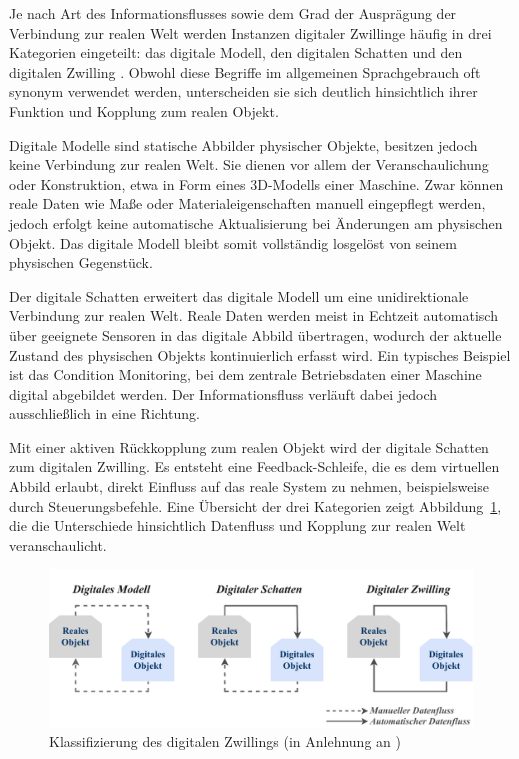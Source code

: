 Je nach Art des Informationsflusses sowie dem Grad der Ausprägung der Verbindung zur realen Welt werden Instanzen digitaler Zwillinge häufig in drei Kategorien eingeteilt: das digitale Modell, den digitalen Schatten und den digitalen Zwilling \cite{ClassificationDT}.
Obwohl diese Begriffe im allgemeinen Sprachgebrauch oft synonym verwendet werden, unterscheiden sie sich deutlich hinsichtlich ihrer Funktion und Kopplung zum realen Objekt.

Digitale Modelle sind statische Abbilder physischer Objekte, besitzen jedoch keine Verbindung zur realen Welt. 
Sie dienen vor allem der Veranschaulichung oder Konstruktion, etwa in Form eines 3D-Modells einer Maschine. 
Zwar können reale Daten wie Maße oder Materialeigenschaften manuell eingepflegt werden, jedoch erfolgt keine automatische Aktualisierung bei Änderungen am physischen Objekt. 
Das digitale Modell bleibt somit vollständig losgelöst von seinem physischen Gegenstück.

Der digitale Schatten erweitert das digitale Modell um eine unidirektionale Verbindung zur realen Welt.
Reale Daten werden meist in Echtzeit automatisch über geeignete Sensoren in das digitale Abbild übertragen, wodurch der aktuelle Zustand des physischen Objekts kontinuierlich erfasst wird.
Ein typisches Beispiel ist das Condition Monitoring, bei dem zentrale Betriebsdaten einer Maschine digital abgebildet werden.
Der Informationsfluss verläuft dabei jedoch ausschließlich in eine Richtung.

Mit einer aktiven Rückkopplung zum realen Objekt wird der digitale Schatten zum digitalen Zwilling.
Es entsteht eine Feedback-Schleife, die es dem virtuellen Abbild erlaubt, direkt Einfluss auf das reale System zu nehmen, beispielsweise durch Steuerungsbefehle.
Eine Übersicht der drei Kategorien zeigt Abbildung~\ref{fig:klassifizierungDT}, die die Unterschiede hinsichtlich Datenfluss und Kopplung zur realen Welt veranschaulicht.

\vspace{-0.5em}
\begin{figure}[htbp]
    \centering
    \includegraphics[width=1\textwidth]{Bilder/klassifizierung_DT.pdf}
    \caption[Klassifizierung des digitalen Zwillings]{Klassifizierung des digitalen Zwillings (in Anlehnung an \cite{ClassificationDT})}
    \label{fig:klassifizierungDT}
\end{figure}
\vspace{-0.5em}

